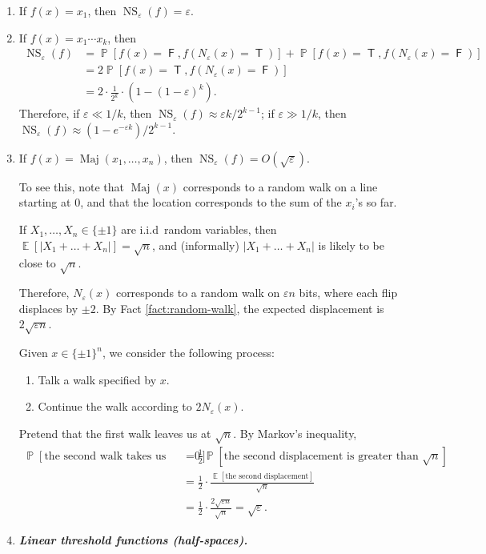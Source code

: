 \documentclass[letterpaper, reqno,11pt]{article}
\newcommand{\PP}{\mathop{{}\mathbb{P}}}
\newcommand{\EE}{\mathop{{}\mathbb{E}}}
\DeclareMathOperator{\T}{\mathsf{T}}
\DeclareMathOperator{\F}{\mathsf{F}}
\DeclareMathOperator{\NS}{NS}
\DeclareMathOperator{\Maj}{Maj}
\begin{document}
\begin{enumerate}[label=(\roman*)]
  \item If $f(x) = x_1$, then $\NS_\varepsilon(f) = \varepsilon$.
  \item If $f(x) = x_1 \cdots x_k$, then
  \begin{align*}
    \NS_\varepsilon(f) &= \PP[f(x) = \F, f(N_\varepsilon(x) = \T)] + \PP[f(x) = \T, f(N_\varepsilon(x) = \F)] \\
    &= 2\PP[f(x) = \T, f(N_\varepsilon(x) = \F)] \\
    &= 2 \cdot \frac{1}{2^k} \cdot (1 - (1 - \varepsilon)^k).
  \end{align*}
  Therefore, if $\varepsilon \ll 1/k$, then $\NS_\varepsilon(f) \approx \varepsilon k/2^{k - 1}$; if $\varepsilon \gg 1/k$, then $\NS_\varepsilon(f) \approx (1 - e^{-\varepsilon k})/2^{k - 1}$.
  \item If $f(x) = \Maj(x_1, \ldots, x_n)$, then $\NS_\varepsilon(f) = O(\sqrt{\varepsilon})$.
  
  To see this, note that $\Maj(x)$ corresponds to a random walk on a line starting at $0$, and that the location corresponds to the sum of the $x_i$'s so far.

  \begin{fact} \label{fact:random-walk}
    If $X_1, \ldots, X_n \in \{ \pm 1 \}$ are i.i.d\ random variables, then $\EE[|X_1 + \ldots + X_n|] = \sqrt{n}$, and (informally) $|X_1 + \ldots + X_n|$ is likely to be close to $\sqrt{n}$.
  \end{fact}

  Therefore, $N_\varepsilon(x)$ corresponds to a random walk on $\varepsilon n$ bits, where each flip displaces by $\pm 2$. By Fact \ref{fact:random-walk}, the expected displacement is $2\sqrt{\varepsilon n}$.

  Given $x \in \{ \pm 1 \}^n$, we consider the following process:
  \begin{enumerate}[label=\arabic*., itemsep=0pt]
    \item Talk a walk specified by $x$.
    \item Continue the walk according to $2N_\varepsilon(x)$.
  \end{enumerate}

  Pretend that the first walk leaves us at $\sqrt{n}$. By Markov's inequality,
  \begin{align*}
    \PP[\text{the second walk takes us accross $0$}] &= \frac{1}{2} \PP[\text{the second displacement is greater than $\sqrt{n}$}] \\
    &= \frac{1}{2} \cdot \frac{\EE[\text{the second displacement}]}{\sqrt{n}} \\
    &= \frac{1}{2} \cdot \frac{2\sqrt{\varepsilon n}}{\sqrt{n}} = \sqrt{\varepsilon}.
  \end{align*}
  \item {\bf \em Linear threshold functions (half-spaces).}
  

\end{enumerate}
\end{document}
